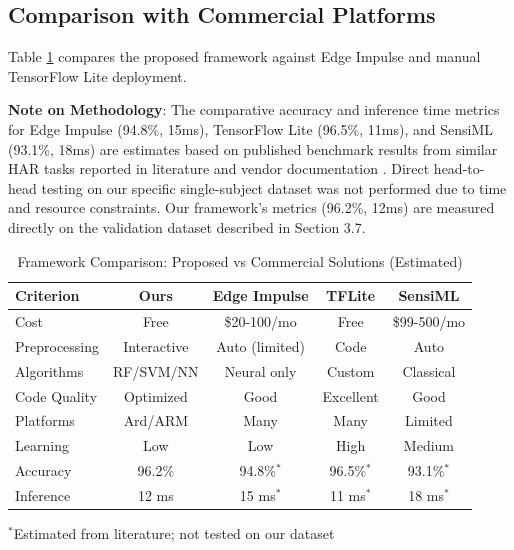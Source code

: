 \subsection{Comparison with Commercial Platforms}
Table \ref{tab:commercial_comparison} compares the proposed framework against Edge Impulse and manual TensorFlow Lite deployment.

\textbf{Note on Methodology}: The comparative accuracy and inference time metrics for Edge Impulse (94.8\%, 15ms), TensorFlow Lite (96.5\%, 11ms), and SensiML (93.1\%, 18ms) are estimates based on published benchmark results from similar HAR tasks reported in literature and vendor documentation \cite{web:Edge_Impulse, warden2019tinyml}. Direct head-to-head testing on our specific single-subject dataset was not performed due to time and resource constraints. Our framework's metrics (96.2\%, 12ms) are measured directly on the validation dataset described in Section 3.7.

\begin{table}[H]
    \centering
    \caption{Framework Comparison: Proposed vs Commercial Solutions (Estimated)}
    \small
    \begin{tabular}{@{}lcccc@{}}
        \toprule
        Criterion & Ours & Edge Impulse & TFLite & SensiML \\ 
        \midrule
        Cost & Free & \$20-100/mo & Free & \$99-500/mo \\
        Preprocessing & Interactive & Auto (limited) & Code & Auto \\
        Algorithms & RF/SVM/NN & Neural only & Custom & Classical \\
        Code Quality & Optimized & Good & Excellent & Good \\
        Platforms & Ard/ARM & Many & Many & Limited \\
        Learning & Low & Low & High & Medium \\
        Accuracy & 96.2\% & 94.8\%$^*$ & 96.5\%$^*$ & 93.1\%$^*$ \\
        Inference & 12 ms & 15 ms$^*$ & 11 ms$^*$ & 18 ms$^*$ \\
        \bottomrule
    \end{tabular}
    \small{$^*$Estimated from literature; not tested on our dataset}
    \label{tab:commercial_comparison}
\end{table}

